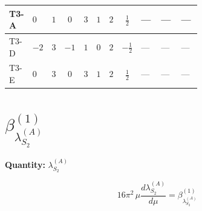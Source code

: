 \documentclass[8pt]{article}
\begin{document}
\begin{landscape}
\begin{longtable}{@{}llcccccc >{\raggedright\arraybackslash}p{0.21\linewidth} >{\raggedright\arraybackslash}p{0.21\linewidth} >{\raggedright\arraybackslash}p{0.21\linewidth}@{}}
\midrule
T3-A & $0$ & $1$ & $0$ & $3$ & $1$ & $2$ & $\frac{1}{2}$ & --- & --- & --- \\
\midrule
T3-D & $-2$ & $3$ & $-1$ & $1$ & $0$ & $2$ & $-\frac{1}{2}$ & --- & --- & --- \\
\midrule
T3-E & $0$ & $3$ & $0$ & $3$ & $1$ & $2$ & $\frac{1}{2}$ & --- & --- & --- \\
\midrule
\bottomrule
\end{longtable}
\clearpage
\section*{$\beta_{\lambda_{S_2}^{(A)}}^{(1)}$}
\noindent\textbf{Quantity: }$\lambda_{S_2}^{(A)}$\par\smallskip
\[16\pi^2\,\mu\frac{d \lambda_{S_2}^{(A)}}{d\mu}=\beta_{\lambda_{S_2}^{(A)}}^{(1)}\]

\end{landscape}
\end{document}
